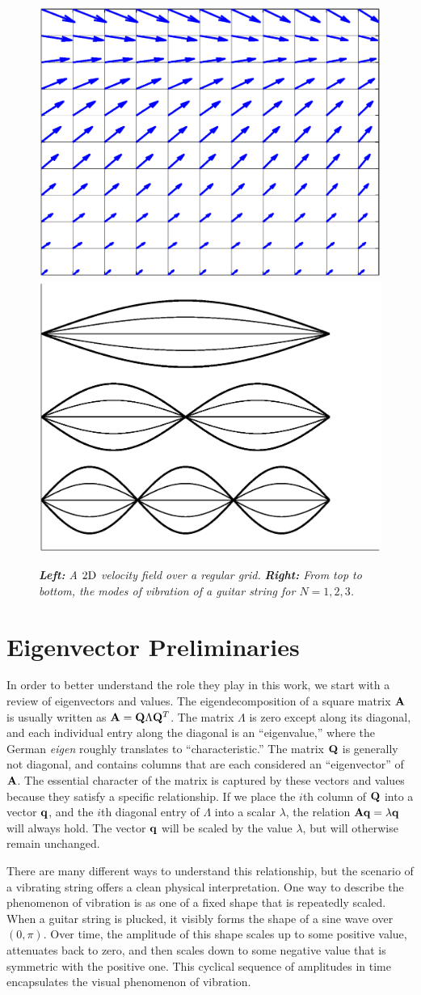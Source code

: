 \begin{figure}[H]
		\centering
		\includegraphics[height=0.3\textwidth]{chap5/figures/velocity_2d.eps}
		\includegraphics[height=0.3\textwidth]{chap5/figures/guitar_modes.eps}
		\caption{{\em{\bf Left:} A $2\textnormal{D}$ velocity field over a regular grid.} {\em{\bf Right:} From top to bottom, the modes of vibration of a guitar string for $N=1, 2, 3$.}}
		\label{fig:velocity-field}
\end{figure}

\section{Eigenvector Preliminaries}
In order to better understand the role they play in this work, we start with a review of eigenvectors and values. The eigendecomposition of a square matrix $\mathbf{A}$ is usually written as $\mathbf{A} = \mathbf{Q} \Lambda \mathbf{Q}^T$. The matrix $\Lambda$ is zero except along its diagonal, and each individual entry along the diagonal is an ``eigenvalue,'' where the German {\em eigen} roughly translates to ``characteristic.'' The matrix $\mathbf{Q}$ is generally not diagonal, and contains columns that are each considered an ``eigenvector'' of $\mathbf{A}$. The essential character of the matrix is captured by these vectors and values because they satisfy a specific relationship. If we place the $i$th column of $\mathbf{Q}$ into a vector $\mathbf{q}$, and the $i$th diagonal entry of $\Lambda$ into a scalar $\lambda$, the relation $\mathbf{A} \mathbf{q} = \lambda \mathbf{q}$ will always hold. The vector $\mathbf{q}$ will be scaled by the value $\lambda$, but will otherwise remain unchanged.

There are many different ways to understand this relationship, but the scenario of a vibrating string offers a clean physical interpretation. One way to describe the phenomenon of vibration is as one of a fixed shape that is repeatedly scaled. When a guitar string is plucked, it visibly forms the shape of a sine wave over $(0, \pi)$. Over time, the amplitude of this shape scales up to some positive value, attenuates back to zero, and then scales down to some negative value that is symmetric with the positive one. This cyclical sequence of amplitudes in time encapsulates the visual phenomenon of vibration.


